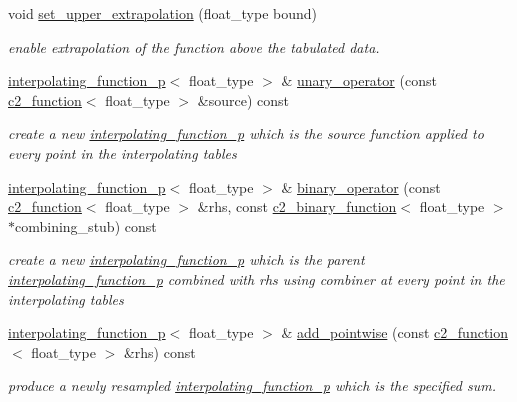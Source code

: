 \begin{DoxyCompactItemize}
void \hyperlink{classinterpolating__function__p_ad9efb0fd01af689dd8218262891d6ab9}{set\+\_\+upper\+\_\+extrapolation} (float\+\_\+type bound)
\begin{DoxyCompactList}\small\item\em enable extrapolation of the function above the tabulated data. \end{DoxyCompactList}\item 
\hyperlink{classinterpolating__function__p}{interpolating\+\_\+function\+\_\+p}$<$ float\+\_\+type $>$ \& \hyperlink{classinterpolating__function__p_aae37d6b9356c6bb5d1bed631b036abba}{unary\+\_\+operator} (const \hyperlink{classc2__function}{c2\+\_\+function}$<$ float\+\_\+type $>$ \&source) const 
\begin{DoxyCompactList}\small\item\em create a new \hyperlink{classinterpolating__function__p}{interpolating\+\_\+function\+\_\+p} which is the {\itshape source} function applied to every point in the interpolating tables \end{DoxyCompactList}\item 
\hyperlink{classinterpolating__function__p}{interpolating\+\_\+function\+\_\+p}$<$ float\+\_\+type $>$ \& \hyperlink{classinterpolating__function__p_acb0a8005ae431aa90098bc6466f7bd77}{binary\+\_\+operator} (const \hyperlink{classc2__function}{c2\+\_\+function}$<$ float\+\_\+type $>$ \&rhs, const \hyperlink{classc2__binary__function}{c2\+\_\+binary\+\_\+function}$<$ float\+\_\+type $>$ $\ast$combining\+\_\+stub) const 
\begin{DoxyCompactList}\small\item\em create a new \hyperlink{classinterpolating__function__p}{interpolating\+\_\+function\+\_\+p} which is the parent \hyperlink{classinterpolating__function__p}{interpolating\+\_\+function\+\_\+p} combined with {\itshape rhs} using {\itshape combiner} at every point in the interpolating tables \end{DoxyCompactList}\item 
\hyperlink{classinterpolating__function__p}{interpolating\+\_\+function\+\_\+p}$<$ float\+\_\+type $>$ \& \hyperlink{classinterpolating__function__p_ac40d79c0de3ceab3168ac8906de4f719}{add\+\_\+pointwise} (const \hyperlink{classc2__function}{c2\+\_\+function}$<$ float\+\_\+type $>$ \&rhs) const 
\begin{DoxyCompactList}\small\item\em produce a newly resampled \hyperlink{classinterpolating__function__p}{interpolating\+\_\+function\+\_\+p} which is the specified sum. \end{DoxyCompactList}\item 

\end{DoxyCompactItemize}
